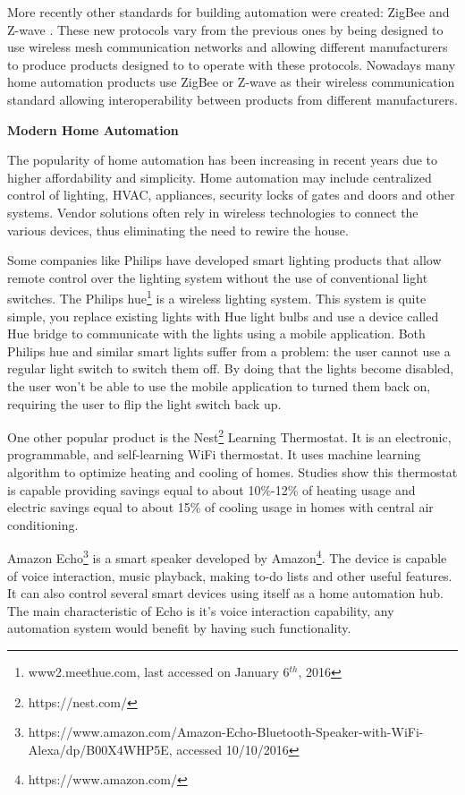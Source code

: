 \documentclass[conference]{IEEEtran}
\begin{document}
More recently other standards for building automation were created: ZigBee \cite{livro_zigbee} and Z-wave \cite{zwave}\cite{zigbeeAndZWave}. These new protocols vary from the previous ones by being designed to use wireless mesh communication networks and allowing different manufacturers to produce products designed to to operate with these protocols. Nowadays many home automation products use ZigBee or Z-wave as their wireless communication standard allowing interoperability between products from different manufacturers.



\textbf{Modern Home Automation}

The popularity of home automation has been increasing in recent years due to higher affordability and simplicity. Home automation may include centralized control of lighting, \ac{HVAC}, appliances, security locks of gates and doors and other systems.
Vendor solutions often rely in wireless technologies to connect the various devices, thus eliminating the need to rewire the house.

Some companies like Philips have developed smart lighting products that allow remote control over the lighting system without the use of conventional light switches. The Philips hue\footnote{www2.meethue.com, last accessed on January 6$^{th}$, 2016} is a wireless lighting system. This system is quite simple, you replace existing lights with Hue light bulbs and use a device called Hue bridge to communicate with the lights using a mobile application. Both Philips hue and similar smart lights suffer from a problem: the user cannot use a regular light switch to switch them off. By doing that the lights become disabled, the user won't be able to use the mobile application to turned them back on, requiring the user to flip the light switch back up.

One other popular product is the Nest\footnote{https://nest.com/} Learning Thermostat. It is an electronic, programmable, and self-learning \ac{WiFi} thermostat. It uses machine learning algorithm to optimize  heating and cooling of homes. Studies\cite{related:nest} show this thermostat is capable providing savings equal to about 10\%-12\% of heating usage and electric savings equal to about 15\% of cooling usage in homes with central air conditioning.

Amazon Echo\footnote{https://www.amazon.com/Amazon-Echo-Bluetooth-Speaker-with-WiFi-Alexa/dp/B00X4WHP5E, accessed 10/10/2016} is a smart speaker developed by Amazon\footnote{https://www.amazon.com/}. The device is capable of voice interaction, music playback, making to-do lists and other useful features. It can also control several smart devices using itself as a home automation hub. The main characteristic of Echo is it's voice interaction capability, any automation system would benefit by having such functionality.
\end{document}
